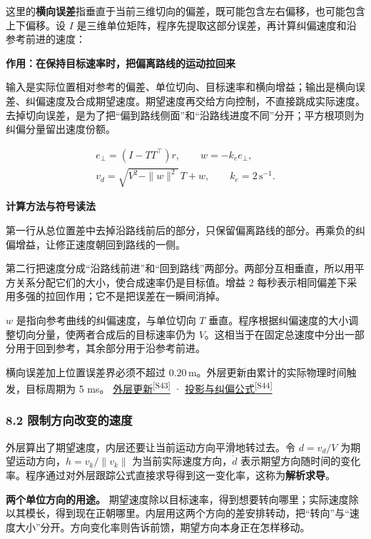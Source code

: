 \documentclass[12pt,a4paper]{article}
\numberwithin{equation}{topic}
\newcommand{\sourceref}[2]{\hyperlink{source-#1}{#2\textsuperscript{[#1]}}}
\begin{document}
这里的\textbf{横向误差}指垂直于当前三维切向的偏差，既可能包含左右偏移，也可能包含上下偏移。设 \(I\) 是三维单位矩阵，程序先提取这部分误差，再计算纠偏速度和沿参考前进的速度：

\noindent\textbf{作用：在保持目标速率时，把偏离路线的运动拉回来}\par\nobreak
输入是实际位置相对参考的偏差、单位切向、目标速率和横向增益；输出是横向误差、纠偏速度及合成期望速度。期望速度再交给方向控制，不直接跳成实际速度。去掉切向误差，是为了把“偏到路线侧面”和“沿路线进度不同”分开；平方根项则为纠偏分量留出速度份额。

\begin{equation}
\label{eq:cross-track}
\begin{gathered}
e_\perp=(I-TT^\top)r,\qquad
w=-k_e e_\perp,\\
v_d=\sqrt{V^2-\|w\|^2}\,T+w,\qquad
k_e=2\,\mathrm{s^{-1}}.
\end{gathered}
\end{equation}

\noindent\textbf{计算方法与符号读法}\par\nobreak
第一行从总位置差中去掉沿路线前后的部分，只保留偏离路线的部分。再乘负的纠偏增益，让修正速度朝回到路线的一侧。

第二行把速度分成“沿路线前进”和“回到路线”两部分。两部分互相垂直，所以用平方关系分配它们的大小，使合成速率仍是目标值。增益 2 每秒表示相同偏差下采用多强的拉回作用；它不是把误差在一瞬间消掉。


\(w\) 是指向参考曲线的纠偏速度，与单位切向 \(T\) 垂直。程序根据纠偏速度的大小调整切向分量，使两者合成后的目标速率仍为 \(V\)。这相当于在固定总速度中分出一部分用于回到参考，其余部分用于沿参考前进。

横向误差加上位置误差界必须不超过 \(0.20\,\mathrm m\)。外层更新由累计的实际物理时间触发，目标周期为 5 ms。 \sourceref{S43}{外层更新} · \sourceref{S44}{投影与纠偏公式}

\subsubsection*{8.2 限制方向改变的速度}

外层算出了期望速度，内层还要让当前运动方向平滑地转过去。令 \(d=v_d/V\) 为期望运动方向，\(h=v_k/\|v_k\|\) 为当前实际速度方向，\(\dot d\) 表示期望方向随时间的变化率。程序通过对外层跟踪公式直接求导得到这一变化率，这称为\textbf{解析求导}。

\textbf{两个单位方向的用途。} 期望速度除以目标速率，得到想要转向哪里；实际速度除以其模长，得到现在正朝哪里。内层用这两个方向的差安排转动，把“转向”与“速度大小”分开。方向变化率则告诉前馈，期望方向本身正在怎样移动。
\end{document}
